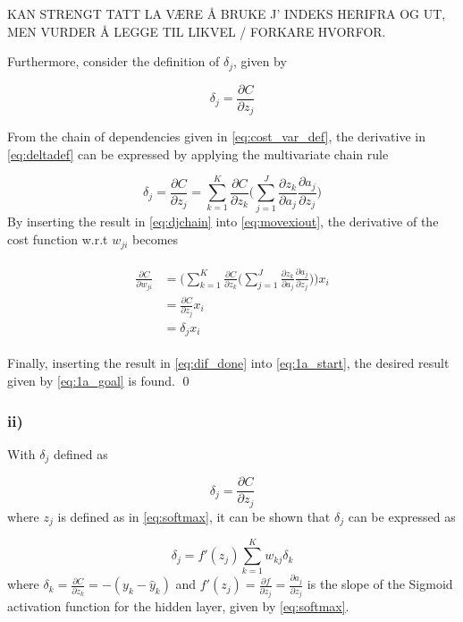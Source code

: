 \documentclass{article}
\begin{document}
KAN STRENGT TATT LA VÆRE Å BRUKE J' INDEKS HERIFRA OG UT, MEN VURDER Å LEGGE TIL LIKVEL / FORKARE HVORFOR.

Furthermore, consider the definition of $\delta_j$, given by

\begin{equation}
    \delta_j = \frac{\partial C}{\partial z_j}
    \label{eq:deltadef}
\end{equation}
 
 From the chain of dependencies given in \eqref{eq:cost_var_def}, the derivative in \eqref{eq:deltadef} can be expressed by applying the multivariate chain rule
 
\begin{equation}
    \delta_j = \frac{\partial C}{\partial z_j} = \sum_{k=1}^K \frac{\partial C}{\partial z_k} \bigg(\sum_{j=1}^J\frac{\partial z_k}{\partial a_j}\frac{\partial a_j}{\partial z_j} \bigg)
    \label{eq:djchain}
\end{equation}
By inserting the result in \eqref{eq:djchain} into \eqref{eq:movexiout}, the derivative of the cost function w.r.t $w_{ji}$ becomes

\begin{align}
\begin{split}
     \frac{\partial C}{\partial w_{ji}} &= \Bigg(\sum_{k=1}^K \frac{\partial C}{\partial z_k}\Bigg( \sum_{j=1}^J \frac{\partial z_k}{\partial a_j}\frac{\partial a_j}{\partial z_j}\Bigg)\Bigg) x_i \\
     &= \frac{\partial C}{\partial z_j} x_i \\
     &= \delta_j x_i
\end{split}
\label{eq:dif_done}
\end{align}

Finally, inserting the result in \eqref{eq:dif_done} into \eqref{eq:1a_start}, the desired result given by \eqref{eq:1a_goal} is found. \qed

\subsubsection*{ii)}

With $\delta_j$ defined as

\begin{equation}
\delta_j = \frac{\partial C}{\partial z_j}
    \label{eq:deltaj}
\end{equation}
where $z_j$ is defined as in \eqref{eq:softmax}, it can be shown that $\delta_j$ can be expressed as

\begin{equation}
    \delta_j = f'(z_j)  \sum_{k=1}^K w_{kj} \delta_k
    \label{eq:part2goal}
\end{equation}
where $\delta_k = \frac{\partial C}{\partial z_k} = -(y_k - \hat{y}_k)$ and $f'(z_j) = \frac{\partial f}{\partial z_j} = \frac{\partial a_j}{\partial z_j}$ is the slope of the Sigmoid activation function for the hidden layer, given by \eqref{eq:softmax}.
\end{document}
